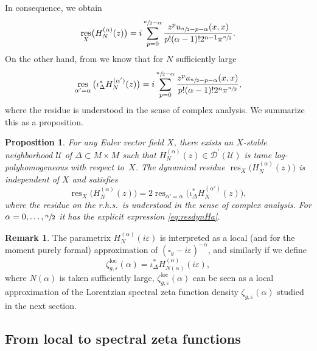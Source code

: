 \documentclass[JEP,XML,SOM,Unicode]{cedram}
\let\pazocal\mathscr
\newtheorem{proposition}[theorem]{Proposition}
\theoremstyle{definition}
\newtheorem{remark}[theorem]{Remark}
\newcommand\loc{\mathrm{loc}}
\let\cv\alpha
\let\euler X
\DeclareMathOperator{\resnorm}{res}
\DeclareMathOperator*{\res}{res}
\newcommand{\resdyn}{{\resnorm_\euler}}
\def\sn2{\sfrac{n}{2}}
\begin{document}
In consequence, we obtain
\begin{equation}\label{eq:resdynHa}
\resdyn\big(H_N^{(\cv)}(z)\big)=
i\sum_{p=0}^{\sfrac{n}{2}-\cv}
\frac{z^pu_{\sfrac{n}{2}-p-\cv}(x,x)}{p!(\cv-1)!2^{n-1}\pi^{\sfrac{n}{2}}}.
\end{equation}
On the other hand, from \cite[\S8.3.1]{Dang2020} we know that for $N$ sufficiently large
\begin{equation*}%
\res_{\alpha'=\alpha} \big(\iota^*_\Delta H_N^{(\alpha')}(z)\big)=
i\sum_{p=0}^{\sfrac{n}{2}-\cv}
\frac{z^p u_{\sfrac{n}{2}-p-\cv}(x,x)}{p!(\cv-1)!2^{n}\pi^{\sfrac{n}{2}}},
\end{equation*}
where the residue is understood in the sense of complex analysis.
We summarize this as a proposition.

\begin{proposition} For any Euler vector field $\euler$, there exists an $\euler$-stable neighborhood $\pazocal{U}$ of $\Delta\subset M\times M$ such that $H_N^{(\cv)}(z)\in \pazocal{D}^\prime(\pazocal{U})$
is tame log-polyhomogeneous with respect to~$\euler$. The dynamical residue $\resdyn\big(H_N^{(\cv)}(z)\big)$ is {independent of} $\euler$ and satisfies
\begin{equation*}%
\resdyn\big(H_N^{(\cv)}(z)\big)={2}\res_{\alpha'=\alpha} \big(\iota^*_\Delta H_N^{(\alpha')}(z)\big),
\end{equation*}
where the residue on the r.h.s.~is understood in the sense of complex analysis.
For $\alpha=0,\dots,\sn2$ it has the explicit expression \eqref{eq:resdynHa}.
\end{proposition}

\begin{remark} The parametrix $H_N^{(\cv)}(i\varepsilon)$ is interpreted as a local (and for the moment purely formal) approximation of $(\square_g-i \varepsilon)^{-\cv}$, and similarly if we define
\[
\zeta_{g,\varepsilon}^{\loc}(\cv)= \iota^*_\Delta H_{N(\alpha)}^{(\alpha)}(i \varepsilon),
\]
where $N(\alpha)$ is taken sufficiently large, $\zeta_{g,\varepsilon}^{\loc}(\cv)$ can be seen as a local approximation of the Lorentzian spectral zeta function density $\zeta_{g,\varepsilon}(\cv)$ studied in the next section.
\end{remark}

\subsection{From local to spectral zeta functions}\label{ss:lg}
\end{document}
